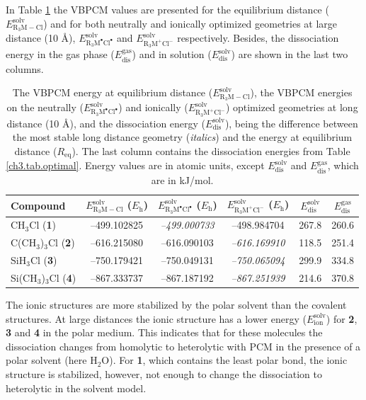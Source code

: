 In Table \ref{ch3.tab.solution} the VBPCM values are presented for the equilibrium distance ($E_\mathrm{R_{3}M-Cl}^\mathrm{solv}$) and for both neutrally and ionically optimized geometries at large distance (10 \AA), $E_\mathrm{R_{3}M^\bullet Cl^\bullet}^\mathrm{solv}$ and $E_\mathrm{R_{3}M^{+} Cl^{-}}^\mathrm{solv}$ respectively. Besides, the dissociation energy in the gas phase ($E_\mathrm{dis}^\mathrm{gas}$) and in solution ($E_\mathrm{dis}^\mathrm{solv}$) are shown in the last two columns.
\begin{table}[htp]
\center
\caption{The VBPCM energy at equilibrium distance ($E_\mathrm{R_{3}M-Cl}^\mathrm{solv}$), the VBPCM energies on the neutrally ($E_\mathrm{R_{3}M^\bullet Cl^\bullet}^\mathrm{solv}$) and ionically ($E_\mathrm{R_{3}M^{+} Cl^{-}}^\mathrm{solv}$) optimized geometries at long distance (10 \AA), and the dissociation energy ($E_\mathrm{dis}^\mathrm{solv}$), being the difference between the most stable long distance geometry (\textit{italics}) and the energy at equilibrium distance ($R_\mathrm{eq}$). The last column contains the dissociation energies from Table \ref{ch3.tab.optimal}. Energy values are in atomic units, except $E_\mathrm{dis}^\mathrm{solv}$ and $E_\mathrm{dis}^\mathrm{gas}$, which are in kJ/mol.}
\begin{tabular}{|l|c|c|c|c|c|}
\hline
\textbf{Compound} & $E_\mathrm{R_{3}M-Cl}^\mathrm{solv}$ ($E_{\mathrm{h}}$) & $E_\mathrm{R_{3}M^\bullet Cl^\bullet}^\mathrm{solv}$ ($E_{\mathrm{h}}$) & $E_\mathrm{R_{3}M^{+} Cl^{-}}^\mathrm{solv}$ ($E_{\mathrm{h}}$) & $E_\mathrm{dis}^\mathrm{solv}$&
$E_\mathrm{dis}^\mathrm{gas}$\\
\hline
CH$_3$Cl (\textbf{1})& --499.102825 & \textit{--499.000733} & --498.984704 & 267.8 & 260.6 \\
C(CH$_3$)$_3$Cl (\textbf{2})& --616.215080 & --616.090103 & \textit{--616.169910} & 118.5 & 251.4 \\
SiH$_3$Cl (\textbf{3})& --750.179421& --750.049131 & \textit{--750.065094} &  299.9 & 334.8 \\
Si(CH$_3$)$_3$Cl (\textbf{4})& --867.333737 & --867.187192 & \textit{--867.251939} & 214.6 & 370.8 \\
\hline
\end{tabular}
\label{ch3.tab.solution}
\end{table} 

The ionic structures are more stabilized by the polar solvent than the covalent structures. At large distances the ionic structure has a lower energy ($E_\mathrm{ion}^\mathrm{solv}$) for \textbf{2}, \textbf{3} and \textbf{4} in the polar medium. This indicates that for these molecules the dissociation changes from homolytic to heterolytic with PCM in the presence of a polar solvent (here H$_2$O). For \textbf{1}, which contains the least polar bond, the ionic structure is stabilized, however, not enough to change the dissociation to heterolytic in the solvent model.


